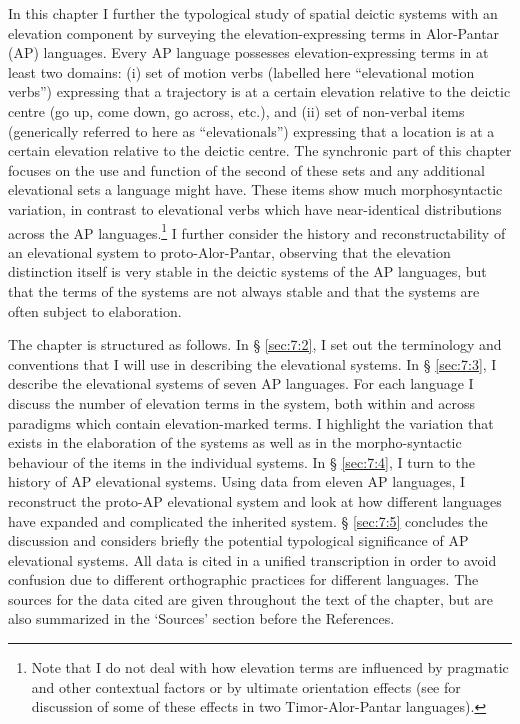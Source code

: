 In this chapter I further the typological study of spatial deictic systems with an elevation component by surveying the elevation-expressing terms in Alor-Pantar (AP) languages. Every AP language possesses elevation-expressing terms in at least two domains: (i) set of motion verbs (labelled here ``elevational motion verbs'') expressing that a trajectory is at a certain elevation relative to the deictic centre (go up, come down, go across, etc.), and (ii) set of non-verbal items (generically referred to here as ``elevationals'') expressing that a location is at a certain elevation relative to the deictic centre. The synchronic part of this chapter focuses on the use and function of the second of these sets and any additional elevational sets a language might have. These items show much morphosyntactic variation, in contrast to elevational verbs which have near-identical distributions across the AP languages.\footnote{Note that I do not deal with how elevation terms are influenced by pragmatic and other contextual factors or by ultimate orientation effects (see \citealt{Schapper2012} for discussion of some of these effects in two Timor-Alor-Pantar languages).} I further consider the history and reconstructability of an elevational system to proto-Alor-Pantar, observing that the elevation distinction itself is very stable in the deictic systems of the AP languages, but that the terms of the systems are not always stable and that the systems are often subject to elaboration. 

The chapter is structured as follows. In {\S} \ref{sec:7:2}, I set out the terminology and conventions that I will use in describing the elevational systems. In {\S} \ref{sec:7:3}, I describe the elevational systems of seven AP languages. For each language I discuss the number of elevation terms in the system, both within and across paradigms which contain elevation-marked terms. I highlight the variation that exists in the elaboration of the systems as well as in the morpho-syntactic behaviour of the items in the individual systems. In {\S} \ref{sec:7:4}, I turn to the history of AP elevational systems. Using data from eleven AP languages, I reconstruct the proto-AP elevational system and look at how different languages have expanded and complicated the inherited system. {\S} \ref{sec:7:5} concludes the discussion and considers briefly the potential typological significance of AP elevational systems.
\enlargethispage{2em}
All data is cited in a unified transcription in order to avoid confusion due to different orthographic practices for different languages. The sources for the data cited are given throughout the text of the chapter, but are also summarized in the `Sources' section before the References. 

